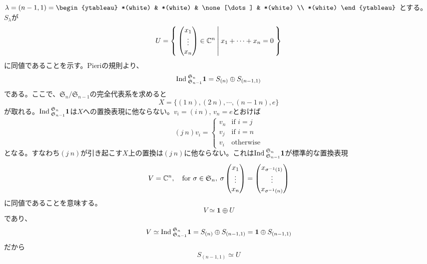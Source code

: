 \documentclass{ltjsreport}
\begin{document}
\begin{eg}
  $\lambda=(n-1,1)=\begin{ytableau}
    *(white) & *(white) & \none[\dots] & *(white) \\
    *(white) 
  \end{ytableau}$
  とする。$S_\lambda$が
  \[
  U=\left\{\:\begin{pmatrix} x_1\\\vdots\\x_n \end{pmatrix}\in\mathbb{C}^n\:\middle|\:x_1+\cdots+x_n=0\:\right\}  
  \]
  に同値であることを示す。Pieriの規則より、
  \[
  \text{Ind}\:_{\mathfrak{S}_{n-1}}^{{\mathfrak{S}_n}}\mathbf{1}=S_{(n)}\oplus S_{(n-1,1)}  
  \]
  である。ここで、$\mathfrak{S}_n/\mathfrak{S}_{n-1}$の完全代表系を求めると
  \[
  X=\{(1\:n), (2\:n), \cdots, (n-1\:n), e\}  
  \]
  が取れる。$\text{Ind}\:_{\mathfrak{S}_{n-1}}^{{\mathfrak{S}_n}}\mathbf{1}$は$X$への置換表現に他ならない。$v_i=(i\:n)$, $v_n=e$とおけば
  \[
  (j\:n)v_i=\left\{\begin{array}{cc}
    v_n & \text{if $i=j$}\\
    v_j & \text{if $i=n$}\\
    v_i & \text{otherwise}
  \end{array}\right.  
  \]
  となる。すなわち$(j\: n)$が引き起こす$X$上の置換は$(j\:n)$に他ならない。これは$\text{Ind}\:_{\mathfrak{S}_{n-1}}^{{\mathfrak{S}_n}}\mathbf{1}$が標準的な置換表現
  \[
  V=\mathbb{C}^n,\quad \text{for }\sigma\in\mathfrak{S}_n,\:\sigma \begin{pmatrix} x_1\\\vdots\\x_n \end{pmatrix}=\begin{pmatrix} x_{\sigma^{-1}(1)}\\\vdots\\x_{\sigma^{-1}(n)} \end{pmatrix}  
  \]
  に同値であることを意味する。
  \[
  V\simeq \mathbf{1}\oplus U  
  \]
  であり、
  \[
  V\simeq \text{Ind}\:_{\mathfrak{S}_{n-1}}^{{\mathfrak{S}_n}}\mathbf{1}=S_{(n)}\oplus S_{(n-1,1)}=\mathbf{1}\oplus S_{(n-1,1)}
  \]
  だから
  \[
  S_{(n-1,1)}\simeq U  
  \]
\end{eg}
\end{document}
